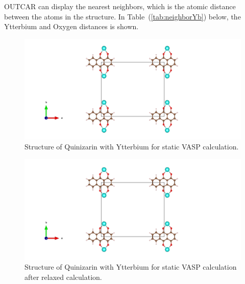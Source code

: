 \documentclass{article}
\begin{document}
      OUTCAR can display the nearest neighbors, which is the atomic distance between the atoms in the structure. In Table~(\ref{tab:neighborYb}) below, the Ytterbium and Oxygen distances is shown. \\

      \begin{figure}[H]
        \centering
        \includegraphics[width = \textwidth]{../fig/Yb_staticbefore_CONTCAR.png}
        \caption{Structure of Quinizarin with Ytterbium for static VASP calculation. }
        \label{fig:Yb_staticbefore_CONTCAR}
      \end{figure}

      \begin{figure}[H]
        \centering
        \includegraphics[width = \textwidth]{../fig/Yb_staticafter_CONTCAR.png}
        \caption{Structure of Quinizarin with Ytterbium for static VASP calculation after relaxed calculation. }
        \label{fig:Yb_staticafter_CONTCAR}
      \end{figure}
\end{document}
